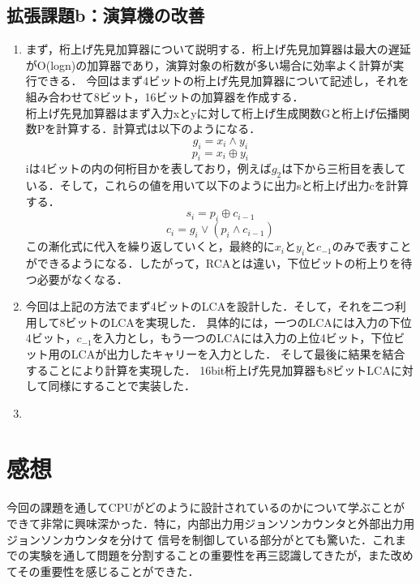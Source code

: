 \documentclass[dvipdfmx]{jarticle}
\begin{document}
\subsection{拡張課題b：演算機の改善}
\begin{enumerate}
  \item まず，桁上げ先見加算器について説明する．桁上げ先見加算器は最大の遅延がO(logn)の加算器であり，演算対象の桁数が多い場合に効率よく計算が実行できる．
  今回はまず4ビットの桁上げ先見加算器について記述し，それを組み合わせて8ビット，16ビットの加算器を作成する．
  \\桁上げ先見加算器はまず入力xとyに対して桁上げ生成関数Gと桁上げ伝播関数Pを計算する．計算式は以下のようになる．
  \[
    g_i = x_i \land y_i
  \]
  \[p_i = x_i \oplus y_i\]
  iは4ビットの内の何桁目かを表しており，例えば$g_2$は下から三桁目を表している．そして，これらの値を用いて以下のように出力sと桁上げ出力cを計算する．
  \[
    s_i = p_i \oplus c_{i-1}
  \]
  \[c_i = g_i \lor (p_i \land c_{i-1}) \]
  この漸化式に代入を繰り返していくと，最終的に$x_i$と$y_i$と$c_{-1}$のみで表すことができるようになる．したがって，RCAとは違い，下位ビットの桁上りを待つ必要がなくなる．
  \item 今回は上記の方法でまず4ビットのLCAを設計した．そして，それを二つ利用して8ビットのLCAを実現した．
  具体的には，一つのLCAには入力の下位4ビット，$c_{-1}$を入力とし，もう一つのLCAには入力の上位4ビット，下位ビット用のLCAが出力したキャリーを入力とした．
  そして最後に結果を結合することにより計算を実現した．
  16bit桁上げ先見加算器も8ビットLCAに対して同様にすることで実装した．
  \item 
\end{enumerate}
\section{感想}
今回の課題を通してCPUがどのように設計されているのかについて学ぶことができて非常に興味深かった．特に，内部出力用ジョンソンカウンタと外部出力用ジョンソンカウンタを分けて
信号を制御している部分がとても驚いた．これまでの実験を通して問題を分割することの重要性を再三認識してきたが，また改めてその重要性を感じることができた．
\end{document}
